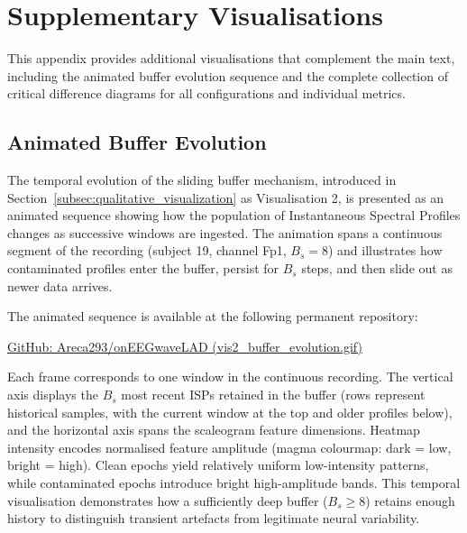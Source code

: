 \documentclass[MScCS,12pt,oneside,final]{uccthesis}
\begin{document}
\backmatter

\printbibliography

\appendix

\chapter{Supplementary Visualisations}
\label{app:supplementary_vis}

This appendix provides additional visualisations that complement the main text, including the animated buffer evolution sequence and the complete collection of critical difference diagrams for all configurations and individual metrics.

\section{Animated Buffer Evolution}
\label{app:animated_buffer}

The temporal evolution of the sliding buffer mechanism, introduced in Section~\ref{subsec:qualitative_visualization} as Visualisation 2, is presented as an animated sequence showing how the population of Instantaneous Spectral Profiles changes as successive windows are ingested. The animation spans a continuous segment of the recording (subject 19, channel Fp1, $B_s = 8$) and illustrates how contaminated profiles enter the buffer, persist for $B_s$ steps, and then slide out as newer data arrives.

The animated sequence is available at the following permanent repository:

\href{https://github.com/Areca293/Evaluating-the-Isolation-Forest-unsupervised-anomaly-detector-of-onEEGWaveLAD/blob/main/vis2\_buffer\_evolution.gif}{GitHub: Areca293/onEEGwaveLAD (vis2\_buffer\_evolution.gif)}

Each frame corresponds to one window in the continuous recording. The vertical axis displays the $B_s$ most recent ISPs retained in the buffer (rows represent historical samples, with the current window at the top and older profiles below), and the horizontal axis spans the scaleogram feature dimensions. Heatmap intensity encodes normalised feature amplitude (magma colourmap: dark = low, bright = high). Clean epochs yield relatively uniform low-intensity patterns, while contaminated epochs introduce bright high-amplitude bands. This temporal visualisation demonstrates how a sufficiently deep buffer ($B_s \geq 8$) retains enough history to distinguish transient artefacts from legitimate neural variability.
\end{document}
